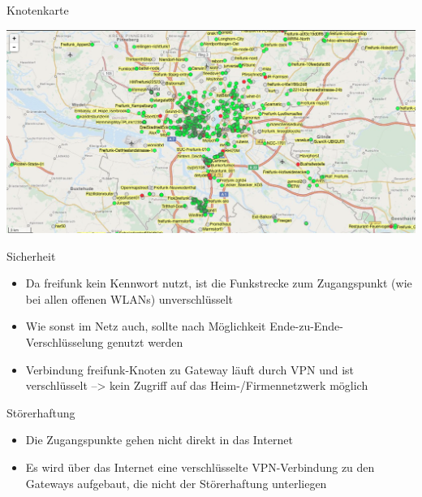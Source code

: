 \documentclass[c]{beamer}
\begin{document}
\begin{frame}{Knotenkarte}
	\begin{center}
		\includegraphics[width=.8\textwidth]{Bilder/knotenkarte1}
	\end{center}
\end{frame}



\begin{frame}{Sicherheit}
	\begin{itemize}
		\item Da freifunk kein Kennwort nutzt, ist die Funkstrecke zum Zugangspunkt (wie bei allen offenen WLANs) unverschlüsselt
		\item Wie sonst im Netz auch, sollte nach Möglichkeit Ende-zu-Ende-Verschlüsselung genutzt werden
		\item Verbindung freifunk-Knoten zu Gateway läuft durch VPN und ist verschlüsselt --> kein Zugriff auf das Heim-/Firmennetzwerk möglich
	\end{itemize}
\end{frame}


\begin{frame}{Störerhaftung}
	\begin{itemize}
		\item Die Zugangspunkte gehen nicht direkt in das Internet
		\item Es wird über das Internet eine verschlüsselte VPN-Verbindung zu den Gateways aufgebaut, die nicht der Störerhaftung unterliegen
	\end{itemize}
\end{frame}
\end{document}
